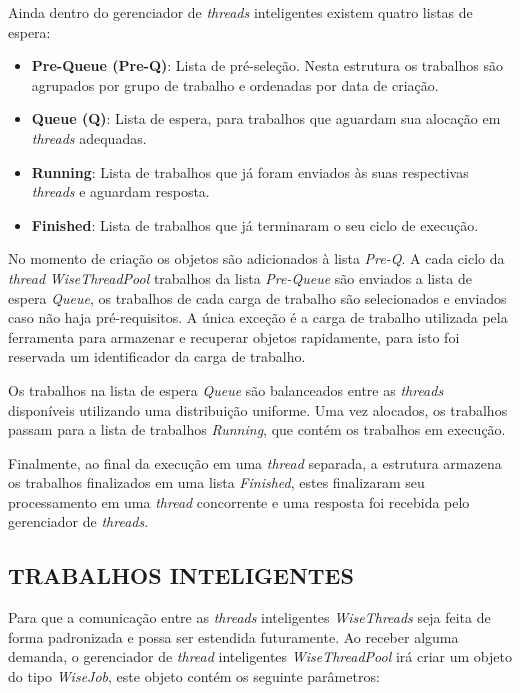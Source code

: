 Ainda dentro do gerenciador de \textit{threads} inteligentes existem quatro listas de espera:

\begin{itemize}
	\item \textbf{Pre-Queue (Pre-Q)}: Lista de pré-seleção. Nesta estrutura os trabalhos são agrupados por grupo de trabalho e ordenadas por data de criação.
	\item \textbf{Queue (Q)}: Lista de espera, para trabalhos que aguardam sua alocação em \textit{threads} adequadas.
	\item \textbf{Running}: Lista de trabalhos que já foram enviados às suas respectivas \textit{threads} e aguardam resposta.
	\item \textbf{Finished}: Lista de trabalhos que já terminaram o seu ciclo de execução.
\end{itemize}

No momento de criação os objetos são adicionados à lista \textit{Pre-Q}. A cada ciclo da \textit{thread} \textit{WiseThreadPool} trabalhos da lista \textit{Pre-Queue} são enviados a lista de espera \textit{Queue}, os trabalhos de cada carga de trabalho são selecionados e enviados caso não haja pré-requisitos. A única exceção é a carga de trabalho utilizada pela ferramenta para armazenar e recuperar objetos rapidamente, para isto foi reservada um identificador da carga de trabalho.

Os trabalhos na lista de espera \textit{Queue} são balanceados entre as \textit{threads} disponíveis utilizando uma distribuição uniforme. Uma vez alocados, os trabalhos passam para a lista de trabalhos \textit{Running}, que contém os trabalhos em execução.

Finalmente, ao final da execução em uma \textit{thread} separada, a estrutura armazena os trabalhos finalizados em uma lista \textit{Finished}, estes finalizaram seu processamento em uma \textit{thread} concorrente e uma resposta foi recebida pelo gerenciador de \textit{threads}.

\subsection{TRABALHOS INTELIGENTES}\label{sec:trabalhos}

Para que a comunicação entre as \textit{threads} inteligentes \textit{WiseThreads} seja feita de forma padronizada e possa ser estendida futuramente. Ao receber alguma demanda, o gerenciador de \textit{thread} inteligentes \textit{WiseThreadPool} irá criar um objeto do tipo \textit{WiseJob}, este objeto contém os seguinte parâmetros:

